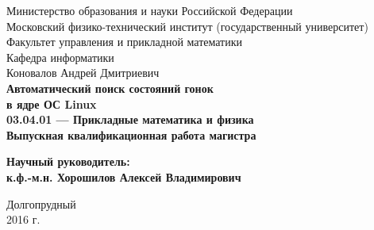 \documentclass[12pt]{article}
\begin{document}

\thispagestyle{empty}

\begin{center}
    \sc
        Министерство образования и науки Российской Федерации\\
        Московский физико-технический институт
        {\rm(государственный университет)}\\
        Факультет управления и прикладной математики\\
        Кафедра информатики\\[20mm]
    \rm\large
        Коновалов Андрей Дмитриевич\\[10mm]
    \bf\Large
        Автоматический поиск состояний гонок\\ в ядре ОС Linux\\[10mm]
    \rm\normalsize
        03.04.01 --- Прикладные математика и физика\\[10mm]
    \sc
        Выпускная квалификационная работа магистра\\[20mm]
\end{center}

\hfill\parbox{90mm}{
    \begin{flushleft}
    \bf
        Научный руководитель:\\
    \rm
        к.ф.-м.н. Хорошилов Алексей Владимирович\\[5cm]
    \end{flushleft}
}

\begin{center}
    Долгопрудный\\
    2016 г.
\end{center}

\newpage

\end{document}
